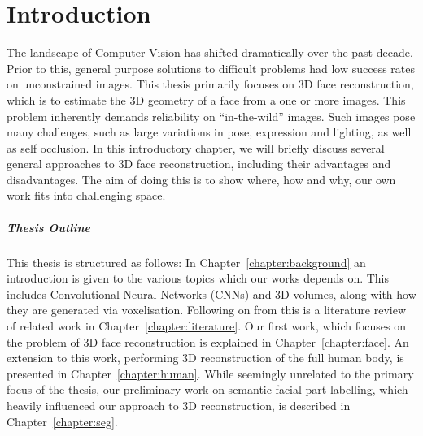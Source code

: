 \chapter{Introduction}

The landscape of Computer Vision has shifted dramatically over the
past decade. Prior to this, general purpose solutions to difficult
problems had low success rates on unconstrained images. This thesis
primarily focuses on 3D face reconstruction, which is to estimate the
3D geometry of a face from a one or more images. This problem
inherently demands reliability on ``in-the-wild'' images. Such images
pose many challenges, such as large variations in pose, expression and
lighting, as well as self occlusion. In this introductory chapter, we
will briefly discuss several general approaches to 3D face
reconstruction, including their advantages and disadvantages. The aim
of doing this is to show where, how and why, our own work fits into
challenging space.






\paragraph{Thesis Outline} This thesis is structured as follows: In
Chapter~\ref{chapter:background} an introduction is given to the
various topics which our works depends on. This includes Convolutional
Neural Networks (CNNs) and 3D volumes, along with how they are
generated via voxelisation. Following on from this is a literature
review of related work in Chapter~\ref{chapter:literature}. Our first
work, which focuses on the problem of 3D face reconstruction is
explained in Chapter~\ref{chapter:face}. An extension to this work,
performing 3D reconstruction of the full human body, is presented in
Chapter~\ref{chapter:human}. While seemingly unrelated to the primary
focus of the thesis, our preliminary work on semantic facial part
labelling, which heavily influenced our approach to 3D reconstruction,
is described in Chapter~\ref{chapter:seg}.




